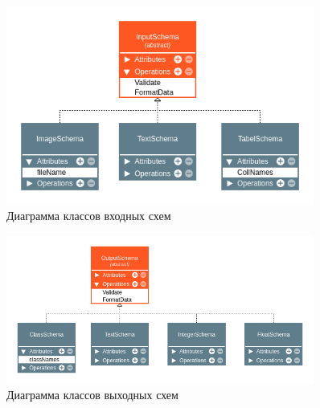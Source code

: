 \begin{figure}[h!]
    \includegraphics[width=0.9\textwidth]{./inputschema.png}
    \caption{Диаграмма классов входных схем}
\end{figure}

\begin{figure}[h!]
    \includegraphics[width=0.9\textwidth]{./outputschema.png}
    \caption{Диаграмма классов выходных схем}
\end{figure}
